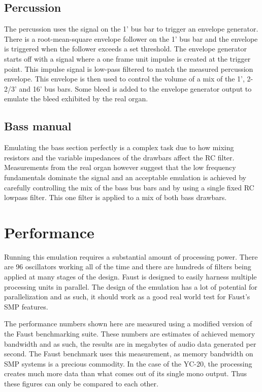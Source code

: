 \documentclass[11pt,a4paper]{article}
\begin{document}
\subsection{Percussion}

The percussion uses the signal on the 1' bus bar to trigger an envelope generator. There is a root-mean-square envelope follower on the 1' bus bar and the envelope is triggered when the follower exceeds a set threshold. The envelope generator starts off with a signal where a one frame unit impulse is created at the trigger point. This impulse signal is low-pass filtered to match the measured percussion envelope. This envelope is then used to control the volume of a mix of the 1', 2-2/3' and 16' bus bars. Some bleed is added to the envelope generator output to emulate the bleed exhibited by the real organ.

\subsection{Bass manual}

Emulating the bass section perfectly is a complex task due to how mixing resistors and the variable impedances of the drawbars affect the RC filter. Measurements from the real organ however suggest that the low frequency fundamentals dominate the signal and an acceptable emulation is achieved by carefully controlling the mix of the bass bus bars and by using a single fixed RC lowpass filter. This one filter is applied to a mix of both bass drawbars.

\section{Performance}
\label{section:performance}

Running this emulation requires a substantial amount of processing power. There are 96 oscillators working all of the time and there are hundreds of filters being applied at many stages of the design. Faust is designed to easily harness multiple processing units in parallel. The design of the emulation has a lot of potential for parallelization and as such, it should work as a good real world test for Faust's SMP features.

The performance numbers shown here are measured using a modified version of the Faust benchmarking suite. These numbers are estimates of achieved memory bandwidth and as such, the results are in megabytes of audio data generated per second. The Faust benchmark uses this measurement, as memory bandwidth on SMP systems is a precious commodity. In the case of the YC-20, the processing creates much more data than what comes out of its single mono output. Thus these figures can only be compared to each other.
\end{document}
